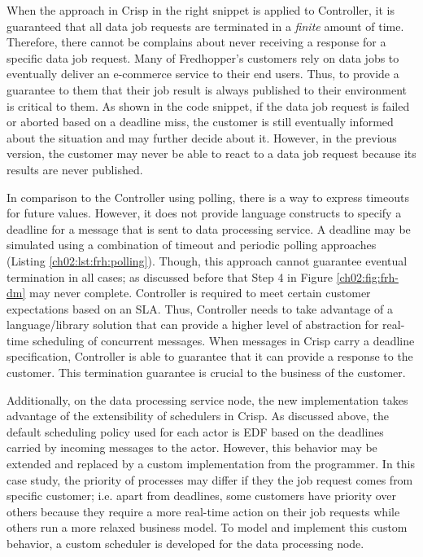 When the approach in Crisp in the right snippet is applied to Controller, it is guaranteed that all data job requests are terminated in a \emph{finite} amount of time.
Therefore, there cannot be complains about never receiving a response for a specific data job request.
Many of Fredhopper's customers rely on data jobs to eventually deliver an e-commerce service to their end users.
Thus, to provide a guarantee to them that their job result is always published to their environment is critical to them.
As shown in the code snippet, if the data job request is failed or aborted based on a deadline miss, 
the customer is still eventually informed about the situation and may further decide about it.
However, in the previous version, the customer may never be able to react to a data job request because its results are never published.

In comparison to the Controller using polling, there is a way to express timeouts for future values.
However, it does not provide language constructs to specify a deadline for a message that is sent to data processing service.
A deadline may be simulated using a combination of timeout and periodic polling approaches (Listing \ref{ch02:lst:frh:polling}).
Though, this approach cannot guarantee eventual termination in all cases; as discussed before that Step 4 in Figure \ref{ch02:fig:frh-dm} may never complete.
Controller is required to meet certain customer expectations based on an SLA.
Thus, Controller needs to take advantage of a language/library solution that can provide a higher level of abstraction for real-time scheduling of concurrent messages.
When messages in Crisp carry a deadline specification, Controller is able to guarantee that it can provide a response to the customer.
This termination guarantee is crucial to the business of the customer.

Additionally, on the data processing service node, the new implementation takes advantage of the extensibility of schedulers in Crisp.
As discussed above, the default scheduling policy used for each actor is EDF based on the deadlines carried by incoming messages to the actor.
However, this behavior may be extended and replaced by a custom implementation from the programmer.
In this case study, the priority of processes may differ if they the job request comes from specific customer; i.e.
apart from deadlines, some customers have priority over others because they require a more real-time action on their job requests while others run a more relaxed business model.
To model and implement this custom behavior, a custom scheduler is developed for the data processing node.

